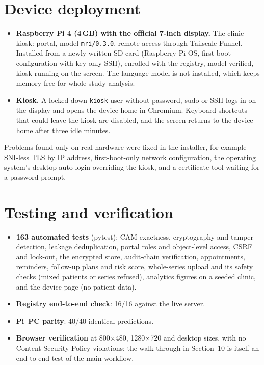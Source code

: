 \documentclass[11pt,a4paper]{article}
\begin{document}
\section{Device deployment}
\begin{itemize}
\item \textbf{Raspberry Pi 4 (4\,GB) with the official 7-inch display.} The clinic kiosk: portal, model
\texttt{mri/0.3.0}, remote access through Tailscale Funnel. Installed from a newly written SD card
(Raspberry Pi OS, first-boot configuration with key-only SSH), enrolled with the registry, model verified, kiosk
running on the screen. The language model is not installed, which keeps memory free for whole-study analysis.
\item \textbf{Kiosk.} A locked-down \texttt{kiosk} user without password, sudo or SSH logs in on the display and opens the
device home in Chromium. Keyboard shortcuts that could leave the kiosk are disabled, and the screen returns to the
device home after three idle minutes.
\end{itemize}
Problems found only on real hardware were fixed in the installer, for example SNI-less TLS by IP address,
first-boot-only network configuration, the operating system's desktop auto-login overriding the kiosk, and a
certificate tool waiting for a password prompt.

\section{Testing and verification}
\begin{itemize}
\item \textbf{163 automated tests} (pytest): CAM exactness, cryptography and tamper detection, leakage deduplication,
portal roles and object-level access, CSRF and lock-out, the encrypted store, audit-chain verification, appointments,
reminders, follow-up plans and risk score, whole-series upload and its safety checks (mixed patients or series
refused), analytics figures on a seeded clinic, and the device page (no patient data).
\item \textbf{Registry end-to-end check}: 16/16 against the live server.
\item \textbf{Pi--PC parity}: 40/40 identical predictions.
\item \textbf{Browser verification} at 800$\times$480, 1280$\times$720 and desktop sizes, with no Content Security
Policy violations; the walk-through in Section~10 is itself an end-to-end test of the main workflow.
\end{itemize}
\end{document}
